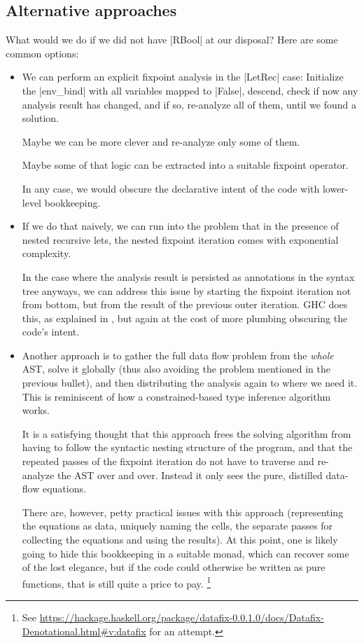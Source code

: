 \documentclass[manuscript,review,screen,acmsmall]{acmart}
\begin{document}

\subsection{Alternative approaches}\label{sec:casestudyalts}
What would we do if we did not have |RBool| at our disposal? Here are some common options:
\begin{itemize}
\item We can perform an explicit fixpoint analysis in the |LetRec| case: Initialize the |env_bind| with all variables mapped to |False|, descend, check if now any analysis result has changed, and if so, re-analyze all of them, until we found a solution.

Maybe we can be more clever and re-analyze only some of them.

Maybe some of that logic can be extracted into a suitable fixpoint operator.

In any case, we would obscure the declarative intent of the code with lower-level bookkeeping.

\item If we do that naively, we can run into the problem that in the presence of nested recursive lets, the nested fixpoint iteration comes with exponential complexity.

In the case where the analysis result is persisted as annotations in the syntax tree anyways, we can address this issue by starting the fixpoint iteration not from bottom, but from the result of the previous outer iteration.
%
GHC does this, as explained in \citet[Section 6.6]{modular}, but again at the cost of more plumbing obscuring the code's intent.

\item Another approach is to gather the full data flow problem from the \emph{whole} AST, solve it globally (thus also avoiding the problem mentioned in the previous bullet), and then distributing the analysis again to where we need it. This is reminiscent of how a constrained-based type inference algorithm works.

It is a satisfying thought that this approach frees the solving algorithm from having to follow the syntactic nesting structure of the program, and that the repeated passes of the fixpoint iteration do not have to traverse and re-analyze the AST over and over. Instead it only sees the pure, distilled data-flow equations.

There are, however, petty practical issues with this approach (representing the equations as data, uniquely naming the cells, the separate passes for collecting the equations and using the results).
At this point, one is likely going to hide this bookkeeping in a suitable monad, which can recover some of the lost elegance, but if the code could otherwise be written as pure functions, that is still quite a price to pay.%
\footnote{See \url{https://hackage.haskell.org/package/datafix-0.0.1.0/docs/Datafix-Denotational.html\#v:datafix} for an attempt.}
\end{itemize}
\end{document}
